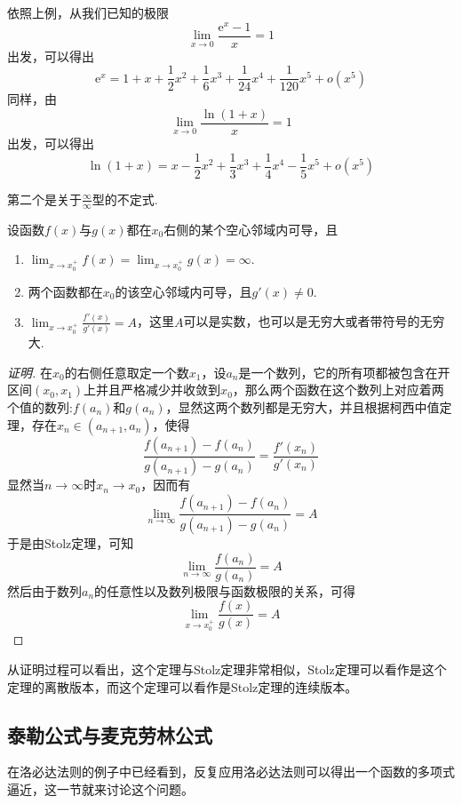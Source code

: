 \begin{example}
  依照上例，从我们已知的极限
  \[ \lim_{x \to 0} \frac{\mathrm{e}^x-1}{x} = 1 \]
  出发，可以得出
  \[ \mathrm{e}^x = 1 + x + \frac{1}{2}x^2+\frac{1}{6}x^3+\frac{1}{24}x^4+\frac{1}{120}x^5+o(x^5) \]
  同样，由
  \[ \lim_{x \to 0} \frac{\ln{(1+x)}}{x} = 1 \]
  出发，可以得出
  \[ \ln{(1+x)} = x - \frac{1}{2}x^2+\frac{1}{3}x^3+\frac{1}{4}x^4-\frac{1}{5}x^5+o(x^5) \]
\end{example}

第二个是关于$\frac{\infty}{\infty}$型的不定式.
\begin{theorem}
  设函数$f(x)$与$g(x)$都在$x_0$右侧的某个空心邻域内可导，且
  \begin{enumerate}
  \item $\lim_{x \to x_0^+} f(x) = \lim_{x \to x_0^+} g(x) = \infty$.
  \item 两个函数都在$x_0$的该空心邻域内可导，且$g'(x) \neq 0$.
  \item $\lim_{x \to x_0^+} \frac{f'(x)}{g'(x)} = A$，这里$A$可以是实数，也可以是无穷大或者带符号的无穷大.
  \end{enumerate}
\end{theorem}

\begin{proof}[证明]
  在$x_0$的右侧任意取定一个数$x_1$，设$a_n$是一个数列，它的所有项都被包含在开区间$(x_0,x_1)$上并且严格减少并收敛到$x_0$，那么两个函数在这个数列上对应着两个值的数列:$f(a_n)$和$g(a_n)$，显然这两个数列都是无穷大，并且根据柯西中值定理，存在$x_n \in (a_{n+1},a_n)$，使得
  \[ \frac{f(a_{n+1})-f(a_n)}{g(a_{n+1})-g(a_n)} = \frac{f'(x_n)}{g'(x_n)} \]
  显然当$n \to \infty$时$x_n \to x_0$，因而有
  \[ \lim_{n \to \infty} \frac{f(a_{n+1})-f(a_n)}{g(a_{n+1})-g(a_n)} = A \]
  于是由Stolz定理，可知
  \[ \lim_{n \to \infty} \frac{f(a_n)}{g(a_n)} = A \]
  然后由于数列$a_n$的任意性以及数列极限与函数极限的关系，可得
  \[ \lim_{x \to x_0^+} \frac{f(x)}{g(x)} = A \]
\end{proof}

从证明过程可以看出，这个定理与Stolz定理非常相似，Stolz定理可以看作是这个定理的离散版本，而这个定理可以看作是Stolz定理的连续版本。

\subsection{泰勒公式与麦克劳林公式}
\label{sec:taylor-formular}

在洛必达法则的例子中已经看到，反复应用洛必达法则可以得出一个函数的多项式逼近，这一节就来讨论这个问题。

